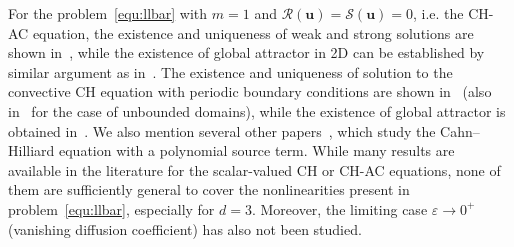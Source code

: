\documentclass[11pt, reqno]{amsart}
\theoremstyle{definition}
\numberwithin{equation}{section}
\newcommand{\bff}{\boldsymbol}
\begin{document}
For the problem~\eqref{equ:llbar} with $m=1$ and $\mathcal{R}(\bff{u}) = \mathcal{S}(\bff{u})=0$, i.e. the CH-AC equation, the existence and uniqueness of weak and strong solutions are shown in~\cite{KarNag14, LiuTan17}, while the existence of global attractor in 2D can be established by similar argument as in~\cite{Kha21}.
The existence and uniqueness of solution to the convective CH equation with periodic boundary conditions are shown in~\cite{EdeKal07} (also in~\cite{Zha18} for the case of unbounded domains), while the existence of global attractor is obtained in~\cite{EdeKal07, ZhaLiu12}. We also mention several other papers~\cite{FakMghNas21, Lam22, Mir13, Mir21}, which study the Cahn--Hilliard equation with a polynomial source term. While many results are available in the literature for the scalar-valued CH or CH-AC equations, none of them are sufficiently general to cover the nonlinearities present in problem~\eqref{equ:llbar}, especially for $d=3$. Moreover, the limiting case $\varepsilon\to 0^+$ (vanishing diffusion coefficient) has also not been studied.
\end{document}
